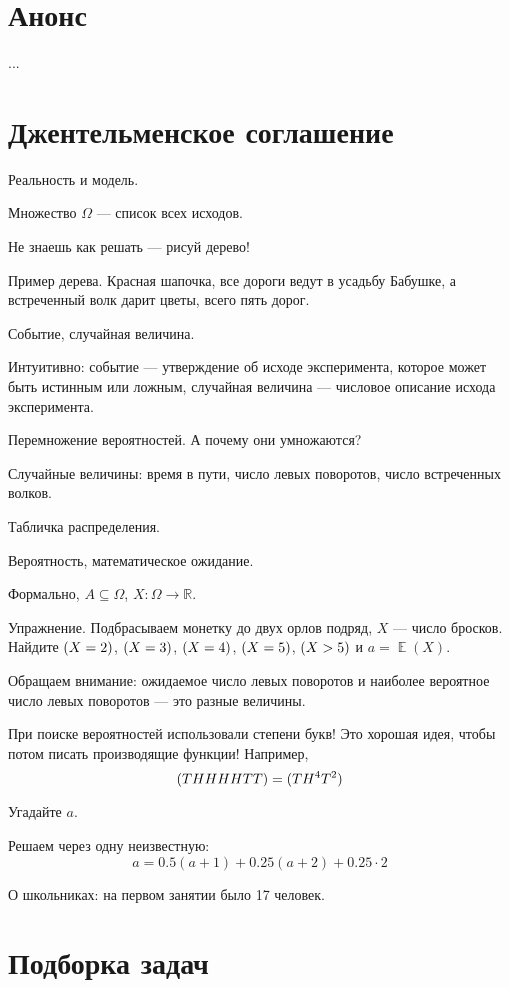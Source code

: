\documentclass[12pt]{article}
\DeclareMathOperator{\E}{\mathbb{E}}
\let\P\relax
\DeclareMathOperator{\P}{\mathbb{P}}
\theoremstyle{definition}
\begin{document}
\tableofcontents{}

\section*{Анонс}
...

\newpage
\setcounter{section}{0}

\section{Джентельменское соглашение}

Реальность и модель. 

Множество $\Omega$ — список всех исходов. 

Не знаешь как решать — рисуй дерево!

Пример дерева. Красная шапочка, все дороги ведут в усадьбу Бабушке, а встреченный волк дарит цветы, всего пять дорог.

Событие, случайная величина. 

Интуитивно: событие — утверждение об исходе эксперимента, которое может быть истинным или ложным, случайная величина — числовое описание исхода эксперимента.

Перемножение вероятностей. А почему они умножаются?

Случайные величины: время в пути, число левых поворотов, число встреченных волков. 

Табличка распределения. 

Вероятность, математическое ожидание. 

Формально, $A \subseteq \Omega$, $X : \Omega \to \mathbb R$.

Упражнение. Подбрасываем монетку до двух орлов подряд, $X$ — число бросков. 
Найдите $\P(X=2)$, $\P(X=3)$, $\P(X=4)$, $\P(X=5)$, $\P(X>5)$ и $a=\E(X)$.

Обращаем внимание: ожидаемое число левых поворотов и наиболее вероятное число левых поворотов — это разные величины.

При поиске вероятностей использовали степени букв! Это хорошая идея, чтобы потом писать производящие функции!
Например,
\[
\P(THHHHTT) = \P(TH^4T^2)  
\]

Угадайте $a$. 

Решаем через одну неизвестную:
\[
a = 0.5(a + 1) + 0.25(a + 2) + 0.25 \cdot 2  
\]

О школьниках: на первом занятии было 17 человек. 


\section{Подборка задач}
\end{document}
